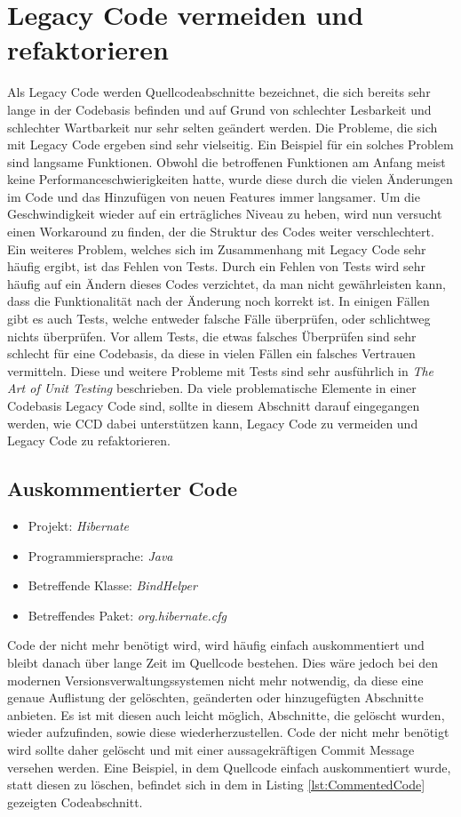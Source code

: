 \section{Legacy Code vermeiden und refaktorieren}
Als Legacy Code \cite{Feathers2013} werden Quellcodeabschnitte bezeichnet, die sich bereits sehr lange in der Codebasis befinden und auf Grund von schlechter Lesbarkeit und schlechter Wartbarkeit nur sehr selten geändert werden. Die Probleme, die sich mit Legacy Code ergeben sind sehr vielseitig. Ein Beispiel für ein solches Problem sind langsame Funktionen. Obwohl die betroffenen Funktionen am Anfang meist keine Performanceschwierigkeiten hatte, wurde diese durch die vielen Änderungen im Code und das Hinzufügen von neuen Features immer langsamer. Um die Geschwindigkeit wieder auf ein erträgliches Niveau zu heben, wird nun versucht einen Workaround zu finden, der die Struktur des Codes weiter verschlechtert. Ein weiteres Problem, welches sich im Zusammenhang mit Legacy Code sehr häufig ergibt, ist das Fehlen von Tests. Durch ein Fehlen von Tests wird sehr häufig auf ein Ändern dieses Codes verzichtet, da man nicht gewährleisten kann, dass die Funktionalität nach der Änderung noch korrekt ist. In einigen Fällen gibt es auch Tests, welche entweder falsche Fälle überprüfen, oder schlichtweg nichts überprüfen. Vor allem Tests, die etwas falsches Überprüfen sind sehr schlecht für eine Codebasis, da diese in vielen Fällen ein falsches Vertrauen vermitteln. Diese und weitere Probleme mit Tests sind sehr ausführlich in \textit{The Art of Unit Testing} \cite{Osherove2013} beschrieben. Da viele problematische Elemente in einer Codebasis Legacy Code sind, sollte in diesem Abschnitt darauf eingegangen werden, wie CCD dabei unterstützen kann, Legacy Code zu vermeiden und Legacy Code zu refaktorieren.

\subsection{Auskommentierter Code}
\label{cha:CommentedCode}
\begin{itemize}
	\item Projekt: \textit{Hibernate}
	\item Programmiersprache: \textit{Java}
	\item Betreffende Klasse: \textit{BindHelper}
	\item Betreffendes Paket: \textit{org.hibernate.cfg}
\end{itemize}

\SuperPar Code der nicht mehr benötigt wird, wird häufig einfach auskommentiert und bleibt danach über lange Zeit im Quellcode bestehen. Dies wäre jedoch bei den modernen Versionsverwaltungssystemen nicht mehr notwendig, da diese eine genaue Auflistung der gelöschten, geänderten oder hinzugefügten Abschnitte anbieten. Es ist mit diesen auch leicht möglich, Abschnitte, die gelöscht wurden, wieder aufzufinden, sowie diese wiederherzustellen. Code der nicht mehr benötigt wird sollte daher gelöscht und mit einer aussagekräftigen Commit Message versehen werden. Eine Beispiel, in dem Quellcode einfach auskommentiert wurde, statt diesen zu löschen, befindet sich in dem in Listing \ref{lst:CommentedCode} gezeigten Codeabschnitt.

